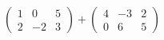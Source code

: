 \hspace*{2mm}\begin{minipage}[t]{\dimexpr\linewidth-2mm\relax}\vspace{0pt}
$\begin{pmatrix} 1 & 0 & 5 \\ 2 & -2 & 3 \end{pmatrix}+\begin{pmatrix} 4 & -3 & 2 \\ 0 & 6 & 5 \end{pmatrix}$\end{minipage}
